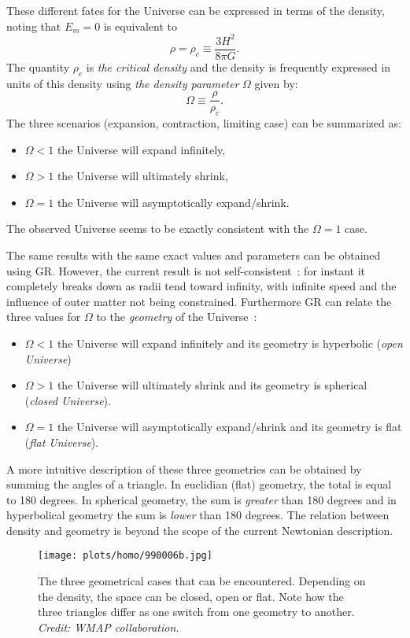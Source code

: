These different fates for the Universe can be expressed in terms of the density, noting that $E_m=0$ is equivalent to
\begin{equation}
	\rho=\rho_c\equiv\frac{3H^2}{8\pi G}.
	\label{eq:rhoc}
\end{equation}
The quantity $\rho_c$ is \emph{the critical density} and the density is frequently expressed in units of this density using \emph{the density parameter} $\Omega$ given by:
\begin{equation}
	\Omega\equiv\frac{\rho}{\rho_c}.
	\label{eq:omega}
\end{equation}
The three scenarios (expansion, contraction, limiting case) can be summarized as:
\begin{itemize}
	\item $\Omega<1$ the Universe will expand infinitely,
	\item $\Omega>1$ the Universe will ultimately shrink,
	\item $\Omega=1$ the Universe will asymptotically expand/shrink.
\end{itemize}
The observed Universe seems to be exactly consistent with the $\Omega=1$ case. 

The same results with the same exact values and parameters can be obtained using GR. However, the current result is not self-consistent~: for instant it completely breaks down as radii tend toward infinity, with infinite speed and the influence of outer matter not being constrained. Furthermore GR can relate the three values for $\Omega$ to the \emph{geometry } of the Universe~:
\begin{itemize}
	\item $\Omega<1$ the Universe will expand infinitely and its geometry is hyperbolic (\emph{open Universe})
	\item $\Omega>1$ the Universe will ultimately shrink and its geometry is spherical (\emph{closed Universe}).
	\item $\Omega=1$ the Universe will asymptotically expand/shrink and its geometry is flat (\emph{flat Universe}).
\end{itemize}
A more intuitive description of these three geometries can be obtained by summing the angles of a triangle. In euclidian (flat) geometry, the total is equal to 180 degrees. In spherical geometry, the sum is \emph{greater} than 180 degrees and in hyperbolical geometry the sum is \emph{lower} than 180 degrees. The relation between density and geometry is beyond the scope of the current Newtonian description.
\begin{figure}[htbp]
	\centering
		\texttt{[image: plots/homo/990006b.jpg]}
	\caption{The three geometrical cases that can be encountered. Depending on the density, the space can be closed, open or flat. Note how the three triangles differ as one switch from one geometry to another. \emph{Credit: WMAP collaboration.}}
	\label{fig:plots_homo_990006b}
\end{figure}

